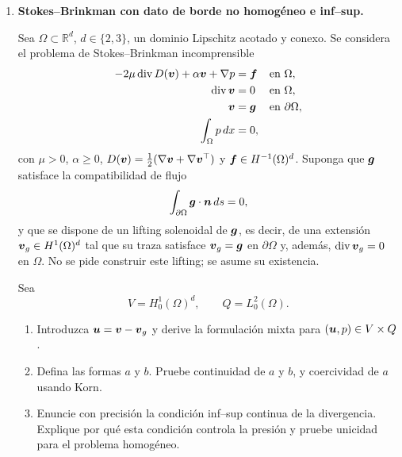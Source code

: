 \documentclass[11pt]{article}
\newcommand{\R}{\mathbb{R}}
\def\vec   #1{\mbox{\boldmath $#1$}{}}
\def\ten   #1{\mbox{\boldmath $#1$}{}}
\DeclareMathOperator{\diver}{div}
\begin{document}
\begin{enumerate}[label=\textbf{\arabic*.}, leftmargin=*]
\begin{enumerate}[label=(\alph*), leftmargin=*]
    \item Plantee la formulaci\'on d\'ebil lagrangiana general para un problema hiperel\'astico con $\vec u=\bar{\vec u}$ en $\Gamma_D$ y $\ten P\vec N=\bar{\vec T}$ en $\Gamma_N$. Proponga un esquema num\'erico de elementos finitos para resolver el problema no lineal quasiest\'atico.
\end{enumerate}

\item \textbf{Stokes--Brinkman con dato de borde no homog\'eneo e inf--sup.}

Sea $\Omega\subset\R^d$, $d\in\{2,3\}$, un dominio Lipschitz acotado y conexo. Se considera el problema de Stokes--Brinkman incomprensible
\begin{equation*}
\begin{aligned}
    -2\mu\diver D(\vec v)+\alpha\vec v+\nabla p&=\vec f &&\text{en }\Omega,\\
    \diver\vec v&=0 &&\text{en }\Omega,\\
    \vec v&=\vec g &&\text{en }\partial\Omega,\\
    \int_\Omega p\,dx&=0,
\end{aligned}
\end{equation*}
con $\mu>0$, $\alpha\ge0$, $D(\vec v)=\frac12(\nabla\vec v+\nabla\vec v^\top)$ y $\vec f\in H^{-1}(\Omega)^d$. Suponga que $\vec g$ satisface la compatibilidad de flujo
\begin{equation*}
    \int_{\partial\Omega}\vec g\cdot\vec n\,ds=0,
\end{equation*}
y que se dispone de un lifting solenoidal de $\vec g$, es decir, de una extensión $\vec v_g\in H^1(\Omega)^d$ tal que su traza satisface $\vec v_g=\vec g$ en $\partial\Omega$ y, además, $\diver\vec v_g=0$ en $\Omega$. No se pide construir este lifting; se asume su existencia.

Sea
\begin{equation*}
    V=H^1_0(\Omega)^d,
    \qquad
    Q=L^2_0(\Omega).
\end{equation*}

\begin{enumerate}[label=(\alph*), leftmargin=*]
    \item Introduzca $\vec u=\vec v-\vec v_g$ y derive la formulaci\'on mixta para $(\vec u,p)\in V\times Q$.

    \item Defina las formas $a$ y $b$. Pruebe continuidad de $a$ y $b$, y coercividad de $a$ usando Korn.

    \item Enuncie con precisi\'on la condici\'on inf--sup continua de la divergencia. Explique por qu\'e esta condici\'on controla la presi\'on y pruebe unicidad para el problema homog\'eneo.


\end{enumerate}
\end{enumerate}
\end{document}
